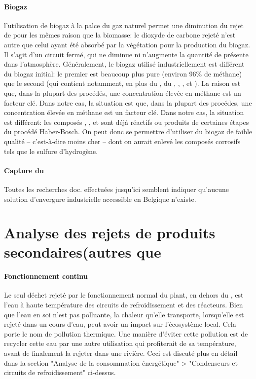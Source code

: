 \documentclass[10pt,a4paper]{report}
\begin{document}
\paragraph{Biogaz}
l'utilisation de biogaz à la palce du gaz naturel permet une diminution du rejet de  pour les mêmes raison que la biomasse: le dioxyde de carbone rejeté n'est autre que celui ayant été absorbé par la végétation pour la production du biogaz. Il s'agit d'un circuit fermé, qui ne diminue ni n'augmente la quantité de  présente dans l'atmosphère.
Généralement, le biogaz utilisé industriellement est différent du biogaz initial: le premier est beaucoup plus pure (environ 96\% de méthane) que le second (qui contient notamment, en plus du , du , , ,  et ). La raison est que, dans la plupart des procédés, une concentration élevée en méthane est un facteur clé. Dans notre cas, la situation est que, dans la plupart des procédes, une concentration élevée en méthane est un facteur clé. Dans notre cas, la situation est différent: les composés , ,  et  sont déjà réactifs ou produits de certaines étapes du procédé Haber-Bosch. On peut donc se permettre d'utiliser du biogaz de faible qualité -- c'est-à-dire moins cher -- dont on aurait enlevé les composés corrosifs tels que le sulfure d'hydrogène.
\paragraph{Capture du }
Toutes les recherches doc. effectuées jusqu'ici semblent indiquer qu'aucune solution d'envergure industrielle accessible en Belgique n'existe.
\section{Analyse des rejets de produits secondaires(autres que }
\paragraph{Fonctionnement continu}
Le seul déchet rejeté par le fonctionnement normal du plant, en dehors du , est l'eau à haute température des circuits de refroidissement et des réacteurs. Bien que l'eau en soi n'est pas polluante, la chaleur qu'elle transporte, lorsqu'elle est rejeté dans un cours d'eau, peut avoir un impact sur l'écosystème local. Cela porte le nom de pollution thermique.
Une manière d'éviter cette pollution est de recycler cette eau par une autre utilisation qui profiterait de sa température, avant de finalement la rejeter dans une rivière. Ceci est discuté plus en détail dans la section "Analyse de la consommation énergétique" > "Condenseurs et circuits de refroidissement" ci-dessus.
\end{document}

